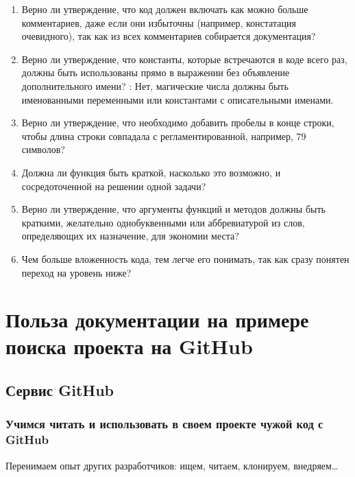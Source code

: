 \documentclass[letterpaper,10pt,russian]{sphinxmanual}
\begin{document}
\begin{enumerate}
\item {} 
\sphinxAtStartPar
Верно ли утверждение, что код должен включать как можно больше комментариев, даже если они избыточны (например, констатация очевидного), так как из всех комментариев собирается документация?

\item {} 
\sphinxAtStartPar
Верно ли утверждение, что константы, которые встречаются в коде всего раз, должны быть использованы прямо в выражении без объявление дополнительного имени? : Нет, магические числа должны быть именованными переменными или константами с описательными именами.

\item {} 
\sphinxAtStartPar
Верно ли утверждение, что необходимо добавить пробелы в конце строки, чтобы длина строки совпадала с регламентированной, например, 79 символов?

\item {} 
\sphinxAtStartPar
Должна ли функция быть краткой, насколько это возможно, и сосредоточенной на решении одной задачи?

\item {} 
\sphinxAtStartPar
Верно ли утверждение, что аргументы функций и методов должны быть краткими, желательно однобуквенными или аббревиатурой из слов, определяющих их назначение, для экономии места?

\item {} 
\sphinxAtStartPar
Чем больше вложенность кода, тем легче его понимать, так как сразу понятен переход на уровень ниже?

\end{enumerate}


\chapter{Польза документации на примере поиска проекта на GitHub}
\label{\detokenize{index:github}}
\sphinxstepscope


\section{Сервис GitHub}
\label{\detokenize{educational_materials/github/content:github}}\label{\detokenize{educational_materials/github/content::doc}}

\subsection{Учимся читать и использовать в своем проекте чужой код с GitHub}
\label{\detokenize{educational_materials/github/content:id1}}
\sphinxAtStartPar
Перенимаем опыт других разработчиков: ищем, читаем, клонируем, внедряем…
\end{document}

